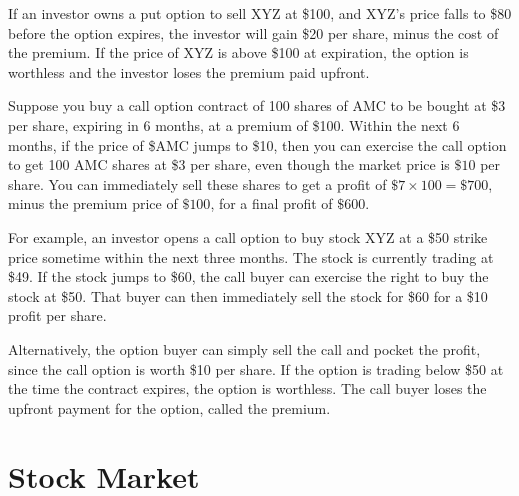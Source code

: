 \documentclass{article}
\begin{document}
      \begin{example}
        If an investor owns a put option to sell XYZ at \$100, and XYZ’s price falls to \$80 before the option expires, the investor will gain \$20 per share, minus the cost of the premium. If the price of XYZ is above \$100 at expiration, the option is worthless and the investor loses the premium paid upfront.
      \end{example}

      \begin{example}
        Suppose you buy a call option contract of 100 shares of AMC to be bought at \$3 per share, expiring in 6 months, at a premium of \$100. Within the next 6 months, if the price of \$AMC jumps to \$10, then you can exercise the call option to get 100 AMC shares at \$3 per share, even though the market price is $\$10$ per share. You can immediately sell these shares to get a profit of $\$7 \times 100 = \$700$, minus the premium price of $\$100$, for a final profit of $\$600$. 
      \end{example}

      \begin{example}
        For example, an investor opens a call option to buy stock XYZ at a \$50 strike price sometime within the next three months. The stock is currently trading at \$49. If the stock jumps to \$60, the call buyer can exercise the right to buy the stock at \$50. That buyer can then immediately sell the stock for \$60 for a \$10 profit per share. 
            
        Alternatively, the option buyer can simply sell the call and pocket the profit, since the call option is worth \$10 per share. If the option is trading below \$50 at the time the contract expires, the option is worthless. The call buyer loses the upfront payment for the option, called the premium.
      \end{example}

\section{Stock Market}
\end{document}
